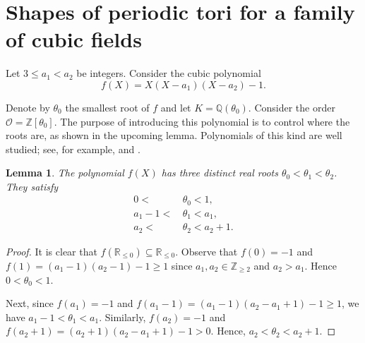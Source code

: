 \documentclass[11pt,letterpaper]{amsart}
\newtheorem{lem}[theorem]{Lemma}
\theoremstyle{definition}
\theoremstyle{remark}
\newcommand{\bb}[1]{\mathbb{#1}}
\newcommand{\Z}{\bb Z}
\begin{document}
	
	
	\section{Shapes of periodic tori for a family of cubic fields}
	\label{ss:cubic-field}
	Let $3 \leq a_1 < a_2$ be integers.
	Consider the cubic polynomial 
	\begin{equation}
	\label{eq:duke_poly}
	   f(X)=X(X-a_1)(X-a_2)-1.
	\end{equation}
	
Denote by $\theta_0$ the smallest root of $f$ and let $K=\mathbb{Q}(\theta_0)$. Consider the order $\mathcal{O}=\Z[\theta_0]$. 
The purpose of introducing this polynomial is to control where the roots are, as shown in the upcoming lemma. 
Polynomials of this kind are well studied; see, for example, \cite{casselsProductInhomogeneousLinear1952} and \cite{ankenyNoteClassNumbersAlgebraic1956}.
	
	\begin{lem}
		\label{le:control_the_roots}
The polynomial $f(X)$ has three distinct real roots $\theta_0< \theta_1< \theta_2$. They satisfy
		\begin{align}
			0 <\, & \theta_0 <  1 ,\\
			a_1 - 1 <\, & \theta_1  < a_1, \\
			a_2 <\, & \theta_2 < a_2 + 1.
		\end{align}
	\end{lem}
	\begin{proof}
		It is clear that $f(\mathbb{R}_{\leq 0}) \subseteq \mathbb{R}_{\leq 0}$.
		Observe that $f(0)=-1$ and $f(1) = (a_1-1)(a_2 - 1)-1 \geq 1$  since 
		$a_1,a_2 \in \mathbb{Z}_{\geq 2}$ and $a_2 > a_1$. Hence $0 < \theta_0 < 1$.
		
		Next, since $f(a_1) = -1$ and $f(a_1-1) = (a_1-1)(a_2-a_1 + 1) - 1 \geq 1$, we have 
		$a_1 -1 < \theta_1 < a_1$.
		Similarly, $f(a_2) = -1$ and $f(a_2+1) = (a_2 + 1)(a_2-a_1 +1) - 1 > 0$. Hence,
		$a_2  < \theta_2 < a_2+1$.
	\end{proof}
	
\end{document}
